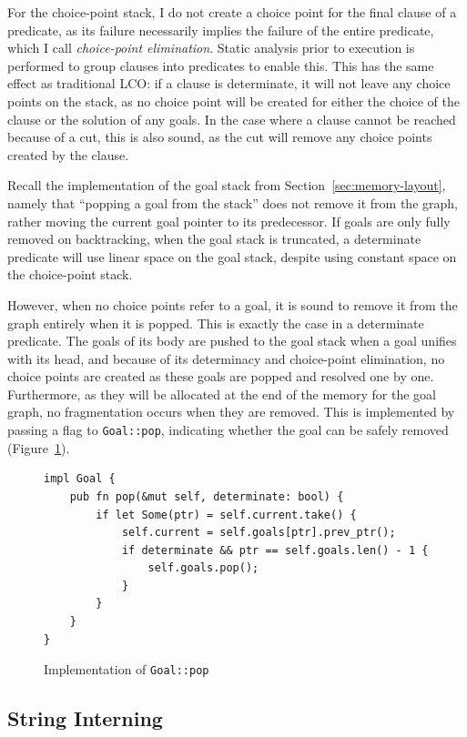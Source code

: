 For the choice-point stack, I do not create a choice point for the final clause of a predicate, as its failure necessarily implies the failure of the entire predicate, which I call \emph{choice-point elimination}. Static analysis prior to execution is performed to group clauses into predicates to enable this. This has the same effect as traditional LCO: if a clause is determinate, it will not leave any choice points on the stack, as no choice point will be created for either the choice of the clause or the solution of any goals. In the case where a clause cannot be reached because of a cut, this is also sound, as the cut will remove any choice points created by the clause.

Recall the implementation of the goal stack from Section~\ref{sec:memory-layout}, namely that ``popping a goal from the stack'' does not remove it from the graph, rather moving the current goal pointer to its predecessor. If goals are only fully removed on backtracking, when the goal stack is truncated, a determinate predicate will use linear space on the goal stack, despite using constant space on the choice-point stack.

However, when no choice points refer to a goal, it is sound to remove it from the graph entirely when it is popped. This is exactly the case in a determinate predicate. The goals of its body are pushed to the goal stack when a goal unifies with its head, and because of its determinacy and choice-point elimination, no choice points are created as these goals are popped and resolved one by one. Furthermore, as they will be allocated at the end of the memory for the goal graph, no fragmentation occurs when they are removed. This is implemented by passing a flag to \texttt{Goal::pop}, indicating whether the goal can be safely removed (Figure~\ref{fig:goal-pop}).

\begin{figure}[H]
\centering
\begin{verbatim}
impl Goal {
    pub fn pop(&mut self, determinate: bool) {
        if let Some(ptr) = self.current.take() {
            self.current = self.goals[ptr].prev_ptr();
            if determinate && ptr == self.goals.len() - 1 {
                self.goals.pop();
            }
        }
    }
}
\end{verbatim}
\caption{Implementation of \texttt{Goal::pop}}
\label{fig:goal-pop}
\end{figure}

\subsection{String Interning}

